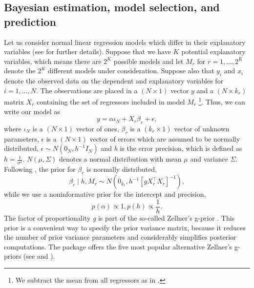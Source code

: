 \subsection{Bayesian estimation, model selection, and prediction}
Let us consider normal linear regression models which differ in their
explanatory variables (see \citealt{Koop2003} for further details).
Suppose that we have $K$ potential explanatory variables, which means
there are $2^K$ possible models and let $M_r$ for $r=1,\dots, 2^K$
denote the $2^K$ different models under consideration.  Suppose also
that $y_i$ and $x_i$ denote the observed data on the dependent and
explanatory variables for $i=1,\ldots,N$. The observations are placed
in a $(N \times 1)$ vector $y$ and a $(N \times k_r)$ matrix $X_r$
containing the set of regressors included in model $M_r$%
\footnote{We subtract the mean from all regressors as in
	\cite{FernandezLeySteel2001a}.}.  Thus, we can write our model as
\begin{equation*}
	y=\alpha \iota_N + X_r\beta_r + \epsilon,
\end{equation*}
where $\iota_N$ is a $(N \times 1)$ vector of ones, $\beta_r$ is a
$(k_r \times 1)$ vector of unknown parameters, $\epsilon$ is a
$(N \times 1)$ vector of errors which are assumed to be normally
distributed, $\epsilon \sim N(0_N, h^{-1}I_N)$ and \textit{h} is the
error precision, which is defined as $h=\frac{1}{\sigma^2}$.
$N(\mu, \Sigma)$ denotes a normal distribution with mean $\mu$ and
variance ${\Sigma}$.  Following \cite{Koop2003}, the prior for
$\beta_r$ is normally distributed,
\begin{equation*}
	\beta_r \mid h, M_r \sim N \left(0_{k_r}, h^{-1} \left [g X_r^\top X_r  \right]^{-1}  \right),
\end{equation*}
while we use a noninformative prior for the intercept and precision,
\begin{equation*}
	p(\alpha) \propto 1, p(h)\propto \frac {1}{h}.
	\label{eq:prior}
\end{equation*}
The factor of proportionality \textit{g} is part of the so-called
Zellner's g-prior \citep{Zellner1986}. This prior is a convenient way
to specify the prior variance matrix, because it reduces the number of
prior variance parameters and considerably simplifies posterior
computations. The  package offers the five most popular
alternative Zellner's g-priors (see \citealt{FernandezLeySteel2001a}
and \citealt{Moral-Benito2010}).

